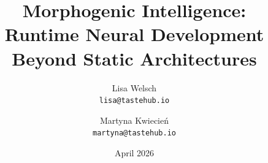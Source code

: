 \documentclass[10pt,conference]{article}
\title{\textbf{Morphogenic Intelligence:\\
Runtime Neural Development Beyond Static Architectures}}
\author{
  Lisa Welsch\\\texttt{lisa@tastehub.io}
  \and
  Martyna Kwiecie\'n\\\texttt{martyna@tastehub.io}
}
\date{April 2026}
\begin{document}
\maketitle

\begin{abstract}

\end{abstract}












\end{document}
